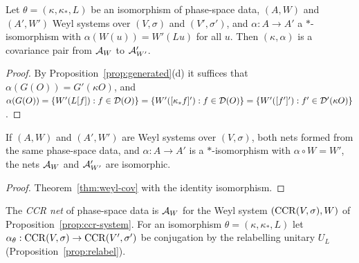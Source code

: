 \begin{theorem}\label{thm:weyl-cov}
Let $\theta=(\kappa,\kappa_*,L)$ be an isomorphism of phase-space data, $(A,W)$ and $(A',W')$ Weyl
systems over $(V,\sigma)$ and $(V',\sigma')$, and $\alpha:A\to A'$ a $*$-isomorphism with
$\alpha(W(u))=W'(Lu)$ for all $u$. Then $(\kappa,\alpha)$ is a covariance pair from $\mathcal A_W$ to
$\mathcal A'_{W'}$.
\end{theorem}
\begin{proof}
By Proposition~\ref{prop:generated}(d) it suffices that $\alpha(G(O))=G'(\kappa O)$, and
$\alpha(G(O))=\{W'(L[f]):f\in\mathcal D(O)\}=\{W'([\kappa_*f]'):f\in\mathcal D(O)\}=\{W'([f']'):f'\in
\mathcal D'(\kappa O)\}$.
\end{proof}
\noindent{}

\begin{corollary}\label{cor:weyl-iso}
If $(A,W)$ and $(A',W')$ are Weyl systems over $(V,\sigma)$, both nets formed from the same
phase-space data, and $\alpha:A\to A'$ is a
$*$-isomorphism with $\alpha\circ W=W'$, the nets $\mathcal A_W$ and $\mathcal A'_{W'}$ are isomorphic.
\end{corollary}
\begin{proof}
Theorem~\ref{thm:weyl-cov} with the identity isomorphism.
\end{proof}
\noindent{}

\begin{definition}\label{def:ccr-net}
The \emph{CCR net} of phase-space data is $\mathcal A_W$ for the Weyl system $(\operatorname{CCR}(V,\sigma),W)$ of
Proposition~\ref{prop:ccr-system}. For an isomorphism $\theta=(\kappa,\kappa_*,L)$ let
$\alpha_\theta:\operatorname{CCR}(V,\sigma)\to\operatorname{CCR}(V',\sigma')$ be conjugation by the relabelling unitary $U_L$
(Proposition~\ref{prop:relabel}).
\end{definition}

